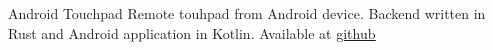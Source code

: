 

\begin{cventries}
    \cventry
    {Android Touchpad }     %
    {} %
    {} %
    {} %
    {Remote touhpad from Android device. Backend written in Rust and 
    Android application in Kotlin. Available at 
    \href{https://github.com/adntgv/touchpad}{\underline{github}}
    }
    
\end{cventries}